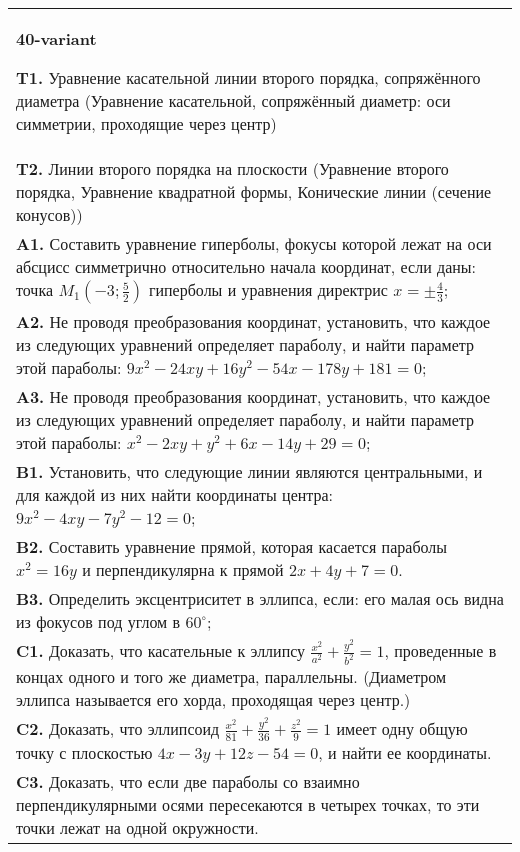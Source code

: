 \documentclass{article}
\begin{document}
\begin{tabular}{m{17cm}}
\textbf{40-variant}
\newline

\textbf{T1.} Уравнение касательной линии второго порядка, сопряжённого диаметра (Уравнение касательной, сопряжённый диаметр: оси симметрии, проходящие через центр) \\
\textbf{T2.} Линии второго порядка на плоскости (Уравнение второго порядка, Уравнение квадратной формы, Конические линии (сечение конусов)) \\
\textbf{A1.} Составить уравнение гиперболы, фокусы которой лежат на оси абсцисс симметрично относительно начала координат, если даны: точка $M_1\left(-3 ; \frac{5}{2}\right)$ гиперболы и уравнения директрис $x= \pm \frac{4}{3}$; \\
\textbf{A2.} Не проводя преобразования координат, установить, что каждое из следующих уравнений определяет параболу, и найти параметр этой параболы: $9 x^2-24 x y+16 y^2-54 x-178 y+181=0$; \\
\textbf{A3.} Не проводя преобразования координат, установить, что каждое из следующих уравнений определяет параболу, и найти параметр этой параболы: $x^2-2 x y+y^2+6 x-14 y+29=0$; \\
\textbf{B1.} Установить, что следующие линии являются центральными, и для каждой из них найти координаты центра: $9 x^2-4 x y-7 y^2-12=0$; \\
\textbf{B2.} Составить уравнение прямой, которая касается параболы $x^2=16 y$ и перпендикулярна к прямой $2 x+4 y+7=0$. \\
\textbf{B3.} Определить эксцентриситет в эллипса, если: его малая ось видна из фокусов под углом в $60^{\circ}$; \\
\textbf{C1.} Доказать, что касательные к эллипсу $\frac{x^2}{a^2}+\frac{y^2}{b^2}=1$, проведенные в концах одного и того же диаметра, параллельны. (Диаметром эллипса называется его хорда, проходящая через центр.) \\
\textbf{C2.} Доказать, что эллипсоид $\frac{x^2}{81}+\frac{y^2}{36}+\frac{z^2}{9}=1$ имеет одну общую точку с плоскостью $4 x-3 y+12 z-54=0$, и найти ее координаты. \\
\textbf{C3.} Доказать, что если две параболы со взаимно перпендикулярными осями пересекаются в четырех точках, то эти точки лежат на одной окружности. \\

\end{tabular}
\vspace{1cm}
\end{document}
